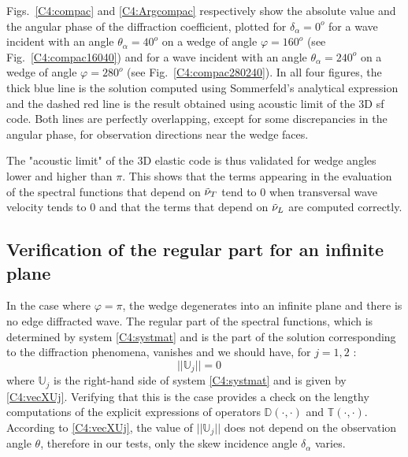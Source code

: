 Figs.~\ref{C4:compac} and \ref{C4:Argcompac} respectively show the absolute value and the angular phase of the diffraction coefficient, plotted for $\delta_{\alpha}=0^o$ for a wave incident with an angle $\theta_{\alpha}=40^o$ on a wedge of angle $\varphi=160^o$ (see Fig.~\ref{C4:compac16040}) and for a wave incident with an angle $\theta_{\alpha}=240^o$ on a wedge of angle $\varphi=280^o$ (see Fig.~\ref{C4:compac280240}). In all four figures, the thick blue line is the solution computed using Sommerfeld's analytical expression and the dashed red line is the result obtained using acoustic limit of the 3D \acrshort{sf} code. Both lines are perfectly overlapping, except for some discrepancies in the angular phase, for observation directions near the wedge faces.

The "acoustic limit" of the 3D elastic code is thus validated for wedge angles lower and higher than $\pi$. This shows that the terms appearing in the evaluation of the spectral functions that depend on $\tilde{\nu}_T$ tend to $0$ when transversal wave velocity tends to $0$ and that the terms that depend on $\tilde{\nu}_L$ are computed correctly. 

\subsection{Verification of the regular part for an infinite plane}
In the case where $\varphi=\pi$, the wedge degenerates into an infinite plane and there is no edge diffracted wave. The regular part of the spectral functions, which is determined by system \eqref{C4:systmat} and is the part of the solution corresponding to the diffraction phenomena, vanishes and we should have, for $j=1,2$ :
\begin{equation}
||\mathbb{U}_j||=0 \hspace{1em} %
\end{equation}
where $\mathbb{U}_j$ is the right-hand side of system \eqref{C4:systmat} and is given by \eqref{C4:vecXUj}. Verifying that this is the case provides a check on the lengthy computations of the explicit expressions of operators $\mathbb{D}(\cdot,\cdot)$ and $\mathbb{T}(\cdot,\cdot)$. According to \eqref{C4:vecXUj}, the value of $||\mathbb{U}_j||$ does not depend on the observation angle $\theta$, therefore in our tests, only the skew incidence angle $\delta_{\alpha}$ varies.

